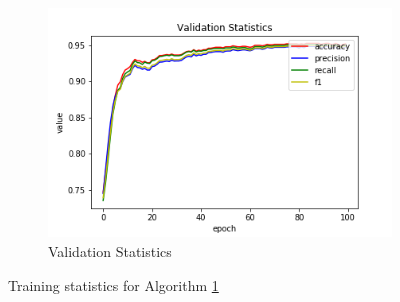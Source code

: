 \begin{figure}[h!]
\begin{subfigure}[b]{0.35\linewidth}
    \includegraphics[width=\linewidth]{images/trained_online_lstm/tile_by_tile_training_uniform_random_fill_10000_model_validation_stats.png}
     \caption{Validation Statistics}
  \end{subfigure}
  \caption{Training statistics for Algorithm \hyperref[tab: app_evalalgorithms]{1}}
  \label{fig: train_olnine_lstm_1}
\end{figure}

